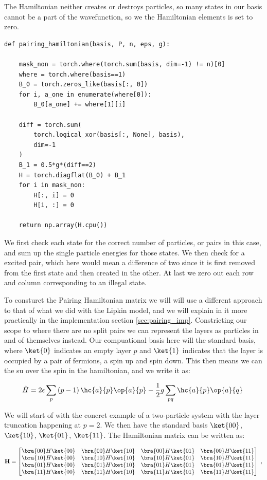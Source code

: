 The Hamiltonian neither creates or destroys particles, so many states in our basis cannot be a part of the wavefunction, so we the Hamiltonian elements is set to zero. 

\begin{verbatim}
def pairing_hamiltonian(basis, P, n, eps, g):

    mask_non = torch.where(torch.sum(basis, dim=-1) != n)[0]
    where = torch.where(basis==1)
    B_0 = torch.zeros_like(basis[:, 0])
    for i, a_one in enumerate(where[0]):
        B_0[a_one] += where[1][i]

    diff = torch.sum(
        torch.logical_xor(basis[:, None], basis),
        dim=-1
    )
    B_1 = 0.5*g*(diff==2)
    H = torch.diagflat(B_0) + B_1
    for i in mask_non:
        H[:, i] = 0
        H[i, :] = 0

    return np.array(H.cpu())
  \end{verbatim}

  We first check each state for the correct number of particles, or pairs in this case, and sum up the single particle energies for those states. We then check for a excited pair, which here would mean a difference of two since it is first removed from the first state and then created in the other. At last we zero out each row and column corresponding to an illegal state.


To consturct the Pairing Hamiltonian matrix we will will use a different approach to that of what we did with the Lipkin model, and we will explain in it more practically in the implementation section \ref{sec:pairing_imp}. Constricting our scope to where there are no split pairs we can represent the layers as particles in and of themselves instead. Our compuational basis here will the standard basis, where $\ket{0}$ indicates an empty layer $p$ and $\ket{1}$ indicates that the layer is occupied by a pair of fermions, a spin up and spin down. This then means we can the su over the spin in the hamiltonian, and we write it as:

$$\hat{H} = 2\epsilon \sum_p \left (p - 1 \right) \hc{a}{p}\op{a}{p} - \frac{1}{2}g \sum_{pq}\hc{a}{p}\op{a}{q} \; $$

We will start of with the concret example of a two-particle system with the layer truncation happening at $p=2$. We then have the standard basis $\ket{00}$, $\ket{10}$, $\ket{01}$, $\ket{11}$. The Hamiltonian matrix can be written as:

$$\mathbf{H} = \begin{bmatrix}
\bra{00} H \ket{00} & \bra{00} H \ket{10} &\bra{00} H \ket{01} & \bra{00} H \ket{11} \\
\bra{10} H \ket{00} & \bra{10} H \ket{10} &\bra{10} H \ket{01} & \bra{10} H \ket{11} \\
\bra{01} H \ket{00} & \bra{01} H \ket{10} &\bra{01} H \ket{01} & \bra{01} H \ket{11} \\
\bra{11} H \ket{00} & \bra{11} H \ket{10} &\bra{11} H \ket{01} & \bra{11} H \ket{11} \\
\end{bmatrix} \; ,
$$

